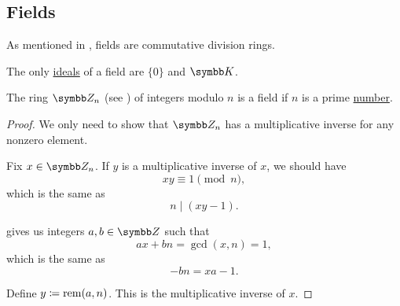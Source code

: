 \subsection{Fields}\label{subsec:fields}

\begin{definition}\label{def:field}
  As mentioned in , fields are commutative division rings.
\end{definition}

\begin{proposition}\label{thm:ideals_of_field}
  The only \hyperref[def:semiring_ideal]{ideals} of a field are \( \{ 0 \} \) and \( \BK \).
\end{proposition}

\begin{theorem}\label{thm:ring_of_integers_module_prime_is_field}
  The ring \( \BZ_n \) (see ) of integers modulo \( n \) is a field if \( n \) is a prime \hyperref[def:prime_number]{number}.
\end{theorem}
\begin{proof}
  We only need to show that \( \BZ_n \) has a multiplicative inverse for any nonzero element.

  Fix \( x \in \BZ_n \). If \( y \) is a multiplicative inverse of \( x \), we should have
  \begin{equation*}
    xy \equiv 1 \pmod n,
  \end{equation*}
  which is the same as
  \begin{equation*}
    n \mid (xy - 1).
  \end{equation*}

   gives us integers \( a, b \in \BZ \) such that
  \begin{equation*}
    ax + bn = \gcd(x, n) = 1,
  \end{equation*}
  which is the same as
  \begin{equation*}
    -bn = xa - 1.
  \end{equation*}

  Define \( y \coloneqq \operatorname{rem}(a, n) \). This is the multiplicative inverse of \( x \).
\end{proof}

